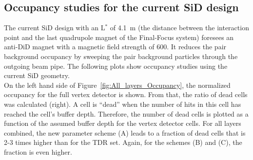 \subsection{Occupancy studies for the current SiD design}
The current SiD design with an L$^*$ of \SI{4.1}{\meter} (the distance between the interaction point and the last quadrupole magnet of the Final-Focus system) foresees an anti-DiD magnet with a magnetic field strength of \SI{600}{\gauss}.
It reduces the pair background occupancy by sweeping the pair background particles through the outgoing beam pipe.
The following plots show occupancy studies using the current SiD geometry.\\
On the left hand side of Figure~\ref{fig:All_layers_Occupancy}, the normalized occupancy for the full vertex detector is shown.
From that, the ratio of dead cells was calculated (right).
A cell is ``dead'' when the number of hits in this cell has reached the cell's buffer depth.
Therefore, the number of dead cells is plotted as a function of the assumed buffer depth for the vertex detector cells.
For all layers combined, the new parameter scheme (A) leads to a fraction of dead cells that is 2-3 times higher than for the TDR set.
Again, for the schemes (B) and (C), the fraction is even higher.
